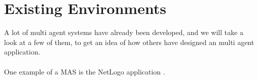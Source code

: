 \chapter{Existing Environments}

A lot of multi agent systems have already been developed, and we will take a look at a few of them, to get an idea of how others have designed an multi agent application.\\
\\
One example of a MAS is the NetLogo application \cite{misc:netlogo}.